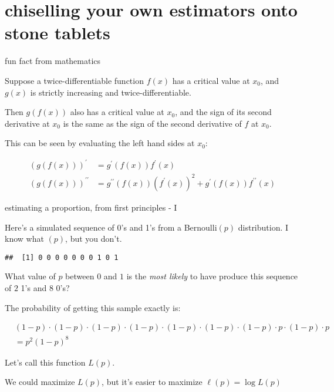 \documentclass[ignorenonframetext,aspectratio=169]{beamer}
\begin{document}
\section{chiselling your own estimators onto stone
tablets}\label{chiselling-your-own-estimators-onto-stone-tablets}

\begin{frame}{fun fact from mathematics}

Suppose a twice-differentiable function \(f(x)\) has a critical value at
\(x_0\), and \(g(x)\) is strictly increasing and twice-differentiable.

Then \(g(f(x))\) also has a critical value at \(x_0\), and the sign of
its second derivative at \(x_0\) is the same as the sign of the second
derivative of \(f\) at \(x_0\).

This can be seen by evaluating the left hand sides at \(x_0\):

\begin{align*}
(g(f(x)))^{\prime} &= g^{\prime}(f(x))f^{\prime}(x)\\
(g(f(x)))^{\prime\prime} &= g^{\prime\prime}(f(x))(f^{\prime}(x))^2 + g^{\prime}(f(x))f^{\prime\prime}(x)
\end{align*}

\end{frame}

\begin{frame}[fragile]{estimating a proportion, from first principles -
I}

Here's a simulated sequence of 0's and 1's from a Bernoulli\((p)\)
distribution. I know what \((p)\), but you don't.

\begin{verbatim}
##  [1] 0 0 0 0 0 0 0 1 0 1
\end{verbatim}

What value of \(p\) between \(0\) and \(1\) is the \textit{most likely}
to have produce this sequence of \(2\) 1's and \(8\) 0's?

\pause The probability of getting this sample exactly is:

\begin{align*}
& (1-p)\cdot (1-p)\cdot (1-p)\cdot (1-p)\cdot (1-p)\cdot (1-p)\cdot (1-p)\cdot p\cdot (1-p)\cdot p \\
&= p^2(1-p)^8
\end{align*}

Let's call this function \(L(p)\).

\pause We could maximize \(L(p)\), but it's easier to maximize
\(\ell(p) = \log{L(p)}\)

\end{frame}
\end{document}
